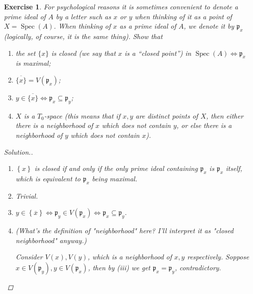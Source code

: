\documentclass{article}
\theoremstyle{breakstyle}
\newtheorem{exercise}{Exercise}
\newenvironment{solution}
  {\begin{proof}[Solution.]\renewcommand{\qedsymbol}{}}
  {\end{proof}}
\DeclareMathOperator{\spec}{Spec}
\begin{document}
\begin{exercise}
For psychological reasons it is sometimes convenient to denote a prime ideal of \(A\) by a letter such as \(x\) or \(y\) when thinking of it as a point of \(X=\spec(A)\). When thinking of \(x\) as a prime ideal of \(A\), we denote it by \(\mathfrak p_x\) (logically, of course, it is the same thing). Show that
\begin{enumerate}[label=(\roman*)]
    \item the set \(\{x\}\) is closed (we say that \(x\) is a ``closed point'') in \(\spec(A)\Leftrightarrow\mathfrak p_x\) is maximal;
    \item \(\overline{\{x\}}=V(\mathfrak p_x)\);
    \item \(y\in\overline{\{x\}}\Leftrightarrow\mathfrak p_x\subseteq\mathfrak p_y\);
    \item \(X\) is a \(T_0\)-space (this means that if \(x,y\) are distinct points of \(X\), then either there is a neighborhood of \(x\) which does not contain \(y\), or else there is a neighborhood of \(y\) which does not contain \(x\)).
\end{enumerate}

\begin{solution}
    \begin{enumerate}[label=({\roman*})]
            \item $\left\{ x \right\} $ is closed if and only if the only prime ideal containing $\mathfrak{p}_{x}$ is $\mathfrak{p}_{x}$ itself, which is equivalent to $\mathfrak{p}_{x}$ being maximal.
            \item Trivial.
            \item $y\in \left\{ \overline{x} \right\} \Leftrightarrow \mathfrak{p}_{y}\in V(\mathfrak{p}_{x})\Leftrightarrow\mathfrak{p}_{x}\subseteq \mathfrak{p}_{y}$.
            \item \emph{(What's the definition of "neighborhood" here? I'll interpret it as "closed neighborhood" anyway.)}

                Consider $V(x),V(y)$, which is a neighborhood of $x,y$ respectively.
                Soppose $x\in V(\mathfrak{p}_{y}),y\in V(\mathfrak{p}_{x})$,
                then by \emph{(iii)} we get $\mathfrak{p}_{x}=\mathfrak{p}_{y}$, contradictory.
        \end{enumerate}
\end{solution}
\end{exercise}
\end{document}
